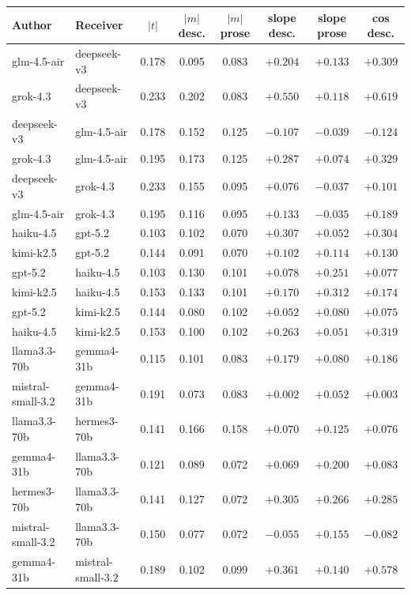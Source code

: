 \begin{table}[H]
\centering\footnotesize
\begin{tabular}{llcccccc}
\toprule
Author & Receiver & $|t|$ & $|m|$ desc. & $|m|$ prose & slope desc. & slope prose & cos desc. \\
\midrule
glm-4.5-air & deepseek-v3 & 0.178 & 0.095 & 0.083 & $+0.204$ & $+0.133$ & $+0.309$ \\
grok-4.3 & deepseek-v3 & 0.233 & 0.202 & 0.083 & $+0.550$ & $+0.118$ & $+0.619$ \\
deepseek-v3 & glm-4.5-air & 0.178 & 0.152 & 0.125 & $-0.107$ & $-0.039$ & $-0.124$ \\
grok-4.3 & glm-4.5-air & 0.195 & 0.173 & 0.125 & $+0.287$ & $+0.074$ & $+0.329$ \\
deepseek-v3 & grok-4.3 & 0.233 & 0.155 & 0.095 & $+0.076$ & $-0.037$ & $+0.101$ \\
glm-4.5-air & grok-4.3 & 0.195 & 0.116 & 0.095 & $+0.133$ & $-0.035$ & $+0.189$ \\
haiku-4.5 & gpt-5.2 & 0.103 & 0.102 & 0.070 & $+0.307$ & $+0.052$ & $+0.304$ \\
kimi-k2.5 & gpt-5.2 & 0.144 & 0.091 & 0.070 & $+0.102$ & $+0.114$ & $+0.130$ \\
gpt-5.2 & haiku-4.5 & 0.103 & 0.130 & 0.101 & $+0.078$ & $+0.251$ & $+0.077$ \\
kimi-k2.5 & haiku-4.5 & 0.153 & 0.133 & 0.101 & $+0.170$ & $+0.312$ & $+0.174$ \\
gpt-5.2 & kimi-k2.5 & 0.144 & 0.080 & 0.102 & $+0.052$ & $+0.080$ & $+0.075$ \\
haiku-4.5 & kimi-k2.5 & 0.153 & 0.100 & 0.102 & $+0.263$ & $+0.051$ & $+0.319$ \\
llama3.3-70b & gemma4-31b & 0.115 & 0.101 & 0.083 & $+0.179$ & $+0.080$ & $+0.186$ \\
mistral-small-3.2 & gemma4-31b & 0.191 & 0.073 & 0.083 & $+0.002$ & $+0.052$ & $+0.003$ \\
llama3.3-70b & hermes3-70b & 0.141 & 0.166 & 0.158 & $+0.070$ & $+0.125$ & $+0.076$ \\
gemma4-31b & llama3.3-70b & 0.121 & 0.089 & 0.072 & $+0.069$ & $+0.200$ & $+0.083$ \\
hermes3-70b & llama3.3-70b & 0.141 & 0.127 & 0.072 & $+0.305$ & $+0.266$ & $+0.285$ \\
mistral-small-3.2 & llama3.3-70b & 0.150 & 0.077 & 0.072 & $-0.055$ & $+0.155$ & $-0.082$ \\
gemma4-31b & mistral-small-3.2 & 0.189 & 0.102 & 0.099 & $+0.361$ & $+0.140$ & $+0.578$ \\

\end{tabular}
\end{table}
